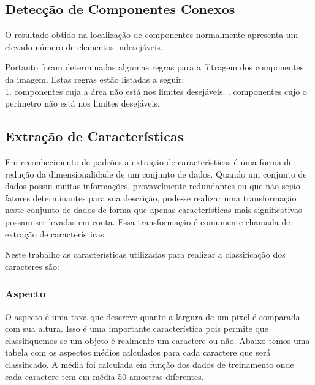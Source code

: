 \documentclass[letterpaper, 10 pt, conference]{ieeeconf}  %
\begin{document}
\subsection{Detecção de Componentes Conexos}

O resultado obtido na localização de componentes normalmente apresenta um
elevado número de elementos indesejáveis.

Portanto foram determinadas algumas regras para a filtragem dos componentes da
imagem. Estas regras estão listadas a seguir:\\
1. componentes cuja a área não está nos limites desejáveis. .
componentes cujo o perimetro não está nos limites desejáveis.\newline

\subsection{Extração de Características} 

Em reconhecimento de padrões a extração de características é uma forma de
redução da dimensionalidade de um conjunto de dados.
Quando um conjunto de dados possui muitas informações, provavelmente redundantes
ou que não sejão fatores determinantes para sua descrição, pode-se realizar uma
transformação neste conjunto de dados de forma que apenas características mais
significativas possam ser levadas em conta. Essa transformação é comumente
chamada de extração de características.

Neste trabalho as características utilizadas para realizar a classificação dos
caracteres são: 

\subsubsection{Aspecto}
O aspecto é uma taxa que descreve quanto a largura de um pixel é comparada com
sua altura. Isso é uma importante característica pois permite que classifiquemos
se um objeto é realmente um caractere ou não. Abaixo temos uma tabela com os
aspectos médios calculados para cada caractere que será classificado.
A média foi calculada em função dos dados de treinamento onde cada caractere tem
em média 50 amostras diferentes.
\end{document}
